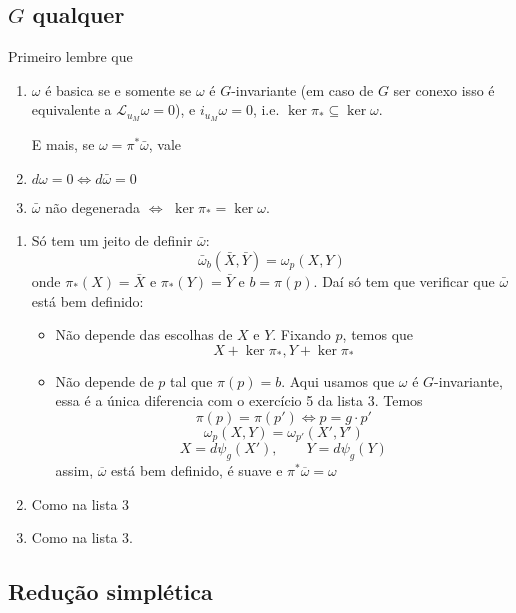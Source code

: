 \subsection{$G$ qualquer}

Primeiro lembre que

\begin{prop}\leavevmode
	\begin{enumerate}
		\item $\omega$ é basica se e somente se $\omega$ é {\color{1}$G$-invariante (em caso de $G$ ser conexo isso é equivalente a $\mathcal{L}_{u_M}\omega=0$}), e $i_{u_M}\omega=0$, i.e. $\ker \pi_* \subseteq \ker \omega$.

			E mais, se $\omega=\pi^*\bar{\omega} $, vale
		\item $ d \omega=0\iff d \bar{\omega} =0$
		\item $\bar{\omega} $ não degenerada $\iff$ $\ker \pi_* =\ker \omega$.
	\end{enumerate}
\end{prop}

\begin{prop}\leavevmode
	\begin{enumerate}
		\item Só tem um jeito de definir $\bar{\omega} $:
	\[\bar{\omega}_b (\bar{X},\bar{Y})=\omega_p(X,Y)\]
	onde $\pi_*(X)=\bar{X}$ e $\pi_*(Y)=\bar{Y}$ e $b=\pi(p)$. Daí só tem que verificar que $\bar{\omega} $ está bem definido:
	\begin{itemize}
	\item Não depende das escolhas de $X$ e $Y$. Fixando $p$, temos que
		\[X+\ker \pi_*,Y+\ker \pi_*\]
	\item Não depende de $p$ tal que $\pi(p)=b$. Aqui usamos que $\omega$ é $G$-invariante, {\color{4}essa é a única diferencia com o exercício 5 da lista 3}. Temos
		\[\pi(p)=\pi(p')\iff p=g\cdot p'\]
		\[\omega_p (X,Y)=\omega_{p'}(X',Y')\]
		\[X=d\psi_g(X'),\qquad Y=d\psi_g(Y)\]
		assim, $\overline{\omega}$ está bem definido, é suave e $\pi^*\overline{\omega}=\omega$ 
	\end{itemize}
	\item Como na lista 3
	\item Como na lista 3.
	\end{enumerate}
\end{prop}

\subsection{Redução simplética}

